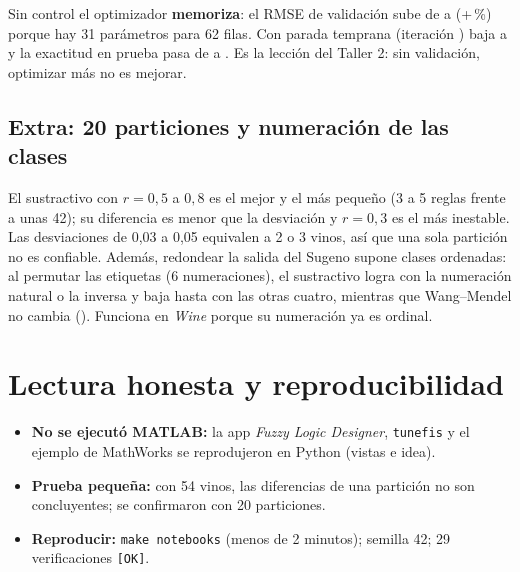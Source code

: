 \documentclass[11pt,letterpaper]{article}
\begin{document}
Sin control el optimizador \textbf{memoriza}: el RMSE de validación sube de \cifratuneValAntes{} a \cifratuneValSin{} (+\cifratuneValSubida\,\%) porque hay 31 parámetros para 62 filas. Con parada temprana (iteración \cifratuneIter) baja a \cifratuneValDesp{} y la exactitud en prueba pasa de
\cifratuneAccAntes{} a \cifratuneAccDesp. Es la lección del Taller 2: sin validación, optimizar más no es mejorar.

\subsection{Extra: 20 particiones y numeración de las clases}\label{sec:veinte}
\begin{table}[H]
\centering\small
\caption{Exactitud en prueba (media $\pm$ desviación) en 20 particiones; la selección de características se rehace en cada una.}\label{tab:veinte}

\end{table}

El sustractivo con $r=0{,}5$ a $0{,}8$ es el mejor y el más pequeño (3 a 5 reglas frente a unas 42); su diferencia es menor que la desviación y $r=0{,}3$ es el más inestable. Las desviaciones de 0,03 a 0,05 equivalen a 2 o 3 vinos, así que una sola partición no es confiable.
Además, redondear la salida del Sugeno supone clases ordenadas: al permutar las etiquetas (6 numeraciones), el sustractivo logra \cifrapropPermMax{} con la numeración natural o la inversa y baja hasta \cifrapropPermMin{} con las otras cuatro, mientras que
Wang--Mendel no cambia (\cifrapropPermWM). Funciona en \textit{Wine} porque su numeración ya es ordinal.

\section{Lectura honesta y reproducibilidad}
\begin{itemize}
  \item \textbf{No se ejecutó MATLAB:} la app \textit{Fuzzy Logic Designer}, \texttt{tunefis} y el ejemplo de MathWorks se reprodujeron en Python (vistas e idea).
  \item \textbf{Prueba pequeña:} con 54 vinos, las diferencias de una partición no son concluyentes; se confirmaron con 20 particiones.
  \item \textbf{Reproducir:} \texttt{make notebooks} (menos de 2 minutos); semilla 42; 29 verificaciones \texttt{[OK]}.
\end{itemize}
\end{document}
